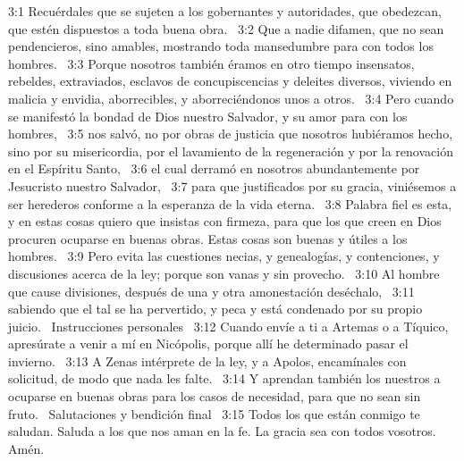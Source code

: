 3:1 Recuérdales que se sujeten a los gobernantes y autoridades, que obedezcan, que estén dispuestos a toda buena obra.  
3:2 Que a nadie difamen, que no sean pendencieros, sino amables, mostrando toda mansedumbre para con todos los hombres.  
3:3 Porque nosotros también éramos en otro tiempo insensatos, rebeldes, extraviados, esclavos de concupiscencias y deleites diversos, viviendo en malicia y envidia, aborrecibles, y aborreciéndonos unos a otros.  
3:4 Pero cuando se manifestó la bondad de Dios nuestro Salvador, y su amor para con los hombres,  
3:5 nos salvó, no por obras de justicia que nosotros hubiéramos hecho, sino por su misericordia, por el lavamiento de la regeneración y por la renovación en el Espíritu Santo,  
3:6 el cual derramó en nosotros abundantemente por Jesucristo nuestro Salvador,  
3:7 para que justificados por su gracia, viniésemos a ser herederos conforme a la esperanza de la vida eterna.  
3:8 Palabra fiel es esta, y en estas cosas quiero que insistas con firmeza, para que los que creen en Dios procuren ocuparse en buenas obras. Estas cosas son buenas y útiles a los hombres.  
3:9 Pero evita las cuestiones necias, y genealogías, y contenciones, y discusiones acerca de la ley; porque son vanas y sin provecho.  
3:10 Al hombre que cause divisiones, después de una y otra amonestación deséchalo,  
3:11 sabiendo que el tal se ha pervertido, y peca y está condenado por su propio juicio.  
Instrucciones personales  
3:12 Cuando envíe a ti a Artemas o a Tíquico, apresúrate a venir a mí en Nicópolis, porque allí he determinado pasar el invierno.  
3:13 A Zenas intérprete de la ley, y a Apolos, encamínales con solicitud, de modo que nada les falte.  
3:14 Y aprendan también los nuestros a ocuparse en buenas obras para los casos de necesidad, para que no sean sin fruto.  
Salutaciones y bendición final  
3:15 Todos los que están conmigo te saludan. Saluda a los que nos aman en la fe. La gracia sea con todos vosotros. Amén. 